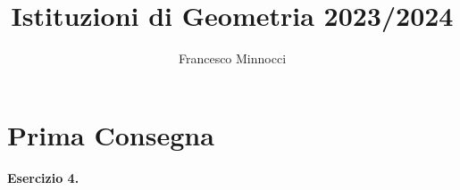 \documentclass[a4paper]{article}
\title{Istituzioni di Geometria 2023/2024}
\author{Francesco Minnocci}
\theoremstyle{definition}
\theoremstyle{definition}
\theoremstyle{remark}
\theoremstyle{definition}
\begin{document}
\maketitle
\section*{Prima Consegna}
\textbf{Esercizio 4.}
\end{document}
